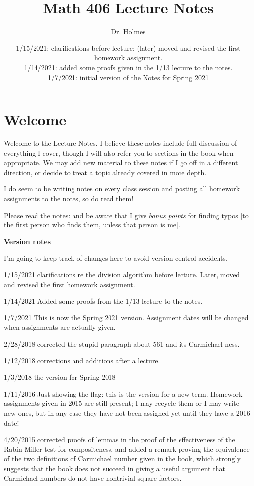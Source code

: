 \documentclass[12pt]{article}
\title{Math 406 Lecture Notes}
\author{Dr. Holmes}
\date{1/15/2021:  clarifications before lecture;  (later) moved and revised the first homework assignment.\\
1/14/2021:  added some proofs given in the 1/13 lecture to the notes.\\
1/7/2021:  initial version of the Notes for Spring 2021}
\begin{document}
\maketitle

\section{Welcome}

Welcome to the Lecture Notes.  I believe these notes include full discussion of everything I cover, though I will also refer you to sections in the book when appropriate.  We may add new material to these notes if I go off in a different direction, or decide to treat a topic already covered in more depth.

I do seem to be writing notes on every class session and posting all homework assignments to the notes, so do read them!

Please read the notes:  and be aware that I give {\em bonus points} for finding typos [to the first person who finds them, unless that person is me].

{\bf Version notes}

I'm going to keep track of changes here to avoid version control accidents.

1/15/2021 clarifications re the division algorithm before lecture.  Later, moved and revised the first homework assignment.

1/14/2021  Added some proofs from the 1/13 lecture to the notes.

1/7/2021 This is now the Spring 2021 version.  Assignment dates will be changed when assignments are actually given.

2/28/2018 corrected the stupid paragraph about 561 and its Carmichael-ness.

1/12/2018 corrections and additions after a lecture.

1/3/2018 the version for Spring 2018

1/11/2016  Just showing the flag:  this is the version for a new term.  Homework assignments given in 2015 are still present; I may recycle them or I may write new ones, but in any case they have not been assigned yet until they have a 2016 date!

4/20/2015 corrected proofs of lemmas in the proof of the effectiveness of the Rabin Miller test for compositeness, and added a remark proving the equivalence of the two definitions of Carmichael number given in the book, which strongly suggests that the book does not succeed in giving a useful argument that Carmichael numbers do not have nontrivial square factors.
\end{document}
